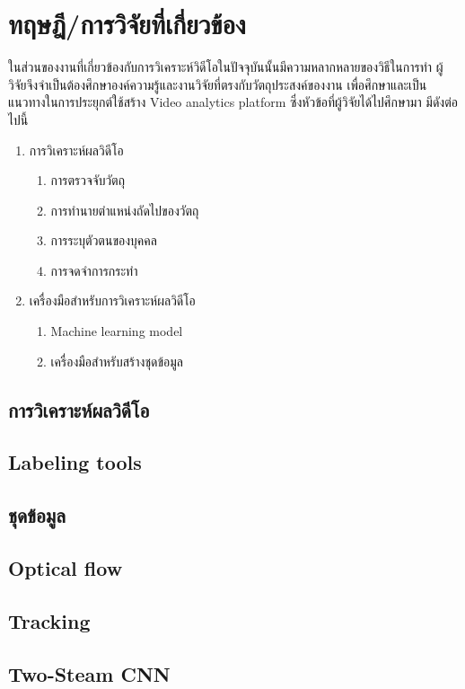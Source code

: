 \clearpage
\chapter{ทฤษฎี/การวิจัยที่เกี่ยวข้อง}
ในส่วนของงานที่เกี่ยวข้องกับการวิเคราะห์วิดีโอในปัจจุบันนั้นมีความหลากหลายของวิธีในการทำ ผู้วิจัยจึงจำเป็นต้องศึกษาองค์ความรู้และงานวิจัยที่ตรงกับวัตถุประสงค์ของงาน เพื่อศึกษาและเป็นแนวทางในการประยุกต์ใช้สร้าง Video analytics platform ซึ่งหัวข้อที่ผู้วิจัยได้ไปศึกษามา มีดังต่อไปนี้
\begin{enumerate}
	\setlength\itemsep{-0.25em}
	\item การวิเคราะห์ผลวิดีโอ
	\begin{enumerate}	
		\item การตรวจจับวัตถุ
		\item การทำนายตำแหน่งถัดไปของวัตถุ
		\item การระบุตัวตนของบุคคล
		\item การจดจำการกระทำ
	\end{enumerate}
	\setlength\itemsep{-0.25em}
	\item เครื่องมือสำหรับการวิเคราะห์ผลวิดีโอ
	\begin{enumerate}	
		\item Machine learning model
		\item เครื่องมือสำหรับสร้างชุดข้อมูล
	\end{enumerate}
\end{enumerate}

\section{การวิเคราะห์ผลวิดีโอ}


\clearpage
\section{Labeling tools}


\clearpage
\section{ชุดข้อมูล}

\clearpage

\clearpage


\section{Optical flow}


\clearpage
\section{Tracking}


\section{Two-Steam CNN}


